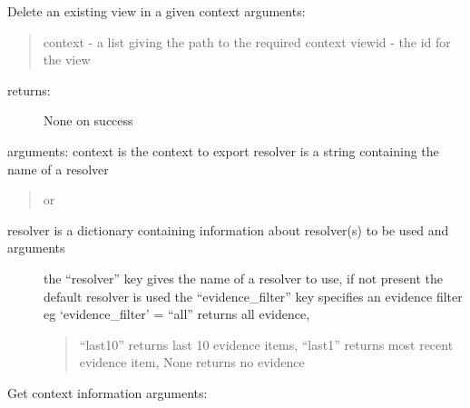 \documentclass[letterpaper,10pt,english]{sphinxmanual}
\begin{document}
\begin{fulllineitems}
\begin{fulllineitems}
\label{API:personis.client.Access.delview}
Delete an existing view in a given context
arguments:
\begin{quote}

context - a list giving the path to the required context
viewid - the id for the view
\end{quote}
\begin{description}
\item[{returns:}] \leavevmode
None on success

\end{description}

\end{fulllineitems}


\begin{fulllineitems}
\label{API:personis.client.Access.export_model}
arguments:
context is the context to export
resolver is a string containing the name of a resolver
\begin{quote}

or
\end{quote}
\begin{description}
\item[{resolver is a dictionary containing information about resolver(s) to be used and arguments}] \leavevmode
the ``resolver'' key gives the name of a resolver to use, if not present the default resolver is used
the ``evidence\_filter'' key specifies an evidence filter
eg `evidence\_filter' =  ``all'' returns all evidence,
\begin{quote}

``last10'' returns last 10 evidence items,
``last1'' returns most recent evidence item,
None returns no evidence
\end{quote}

\end{description}

\end{fulllineitems}


\begin{fulllineitems}
\label{API:personis.client.Access.getcontext}
Get context information
arguments:
\begin{quote}


\end{quote}
\end{fulllineitems}
\end{fulllineitems}
\end{document}
